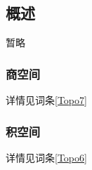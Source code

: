 
\begin{issues}
\issueDraft
\issueTODO
\issueMissDepend
\issueAbstract
\issueNeedCite
\end{issues}

\subsection{概述}

暂略

\subsubsection{商空间}

详情见词条\autoref{Topo7}


\subsubsection{积空间}

详情见词条\autoref{Topo6}



